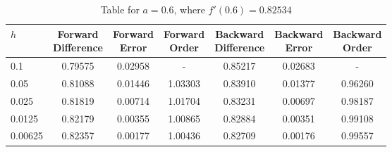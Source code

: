 \begin{table}[H]
\centering
\caption{Table for $a = 0.6$, where $f'(0.6) = 0.82534$}
\begin{tabular}{lcccccc}
\toprule
    $h$ & \makecell{Forward \\ Difference} & \makecell{Forward \\ Error} & \makecell{Forward \\ Order} & \makecell{Backward \\ Difference} & \makecell{Backward \\ Error} & \makecell{Backward \\ Order} \\
\midrule
    0.1 &                          0.79575 &                     0.02958 &                           - &                           0.85217 &                      0.02683 &                            - \\
   0.05 &                          0.81088 &                     0.01446 &                     1.03303 &                           0.83910 &                      0.01377 &                      0.96260 \\
  0.025 &                          0.81819 &                     0.00714 &                     1.01704 &                           0.83231 &                      0.00697 &                      0.98187 \\
 0.0125 &                          0.82179 &                     0.00355 &                     1.00865 &                           0.82884 &                      0.00351 &                      0.99108 \\
0.00625 &                          0.82357 &                     0.00177 &                     1.00436 &                           0.82709 &                      0.00176 &                      0.99557 \\
\bottomrule
\end{tabular}
\end{table}
